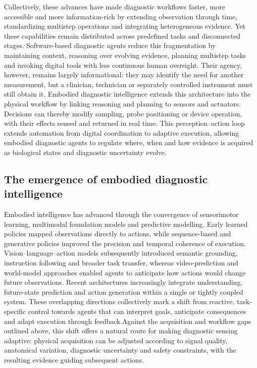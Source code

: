 \documentclass[12pt,a4paper]{article}
\begin{document}
Collectively, these advances have made diagnostic workflows faster, more accessible and more information-rich by extending observation through time, standardizing multistep operations and integrating heterogeneous evidence. Yet these capabilities remain distributed across predefined tasks and disconnected stages. Software-based diagnostic agents reduce this fragmentation by maintaining context, reasoning over evolving evidence, planning multistep tasks and invoking digital tools with less continuous human oversight. Their agency, however, remains largely informational: they may identify the need for another measurement, but a clinician, technician or separately controlled instrument must still obtain it. Embodied diagnostic intelligence extends this architecture into the physical workflow by linking reasoning and planning to sensors and actuators. Decisions can thereby modify sampling, probe positioning or device operation, with their effects sensed and returned in real time. This perception--action loop extends automation from digital coordination to adaptive execution, allowing embodied diagnostic agents to regulate where, when and how evidence is acquired as biological states and diagnostic uncertainty evolve.


\subsection{The emergence of embodied diagnostic intelligence}
\label{subsec:emergence_embodied_medical_detection_intelligence}

Embodied intelligence has advanced through the convergence of sensorimotor learning, multimodal foundation models and predictive modelling. Early learned policies mapped observations directly to actions, while sequence-based and generative policies improved the precision and temporal coherence of execution. Vision--language--action models subsequently introduced semantic grounding, instruction following and broader task transfer, whereas video-prediction and world-model approaches enabled agents to anticipate how actions would change future observations. Recent architectures increasingly integrate understanding, future-state prediction and action generation within a single or tightly coupled system. These overlapping directions collectively mark a shift from reactive, task-specific control towards agents that can interpret goals, anticipate consequences and adapt execution through feedback.Against the acquisition and workflow gaps outlined above, this shift offers a natural route for making diagnostic sensing adaptive: physical acquisition can be adjusted according to signal quality, anatomical variation, diagnostic uncertainty and safety constraints, with the resulting evidence guiding subsequent actions.
\end{document}
